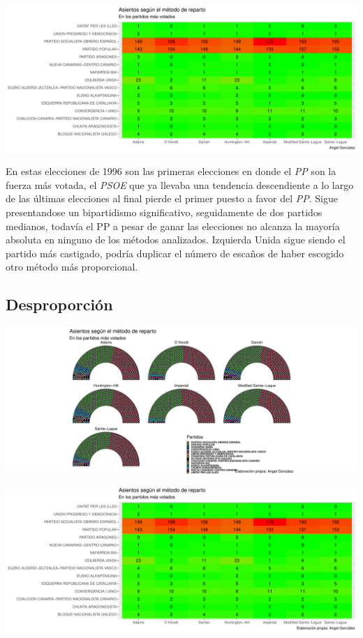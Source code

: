 \documentclass[12pt,a4paper,]{book}
\numberwithin{dummy}{section}
\theoremstyle{ocrenumbox}
\theoremstyle{blacknumex}
\theoremstyle{blacknumbox}
\theoremstyle{ocrenum}
\theoremstyle{ocrenum}
\begin{document}
\begin{center}\includegraphics[width=1\linewidth]{figurasR/unnamed-chunk-91-2} \end{center}

En estas elecciones de 1996 son las primeras elecciones en donde el
\emph{PP} son la fuerza más votada, el \emph{PSOE} que ya llevaba una
tendencia descendiente a lo largo de las últimas elecciones al final
pierde el primer puesto a favor del \emph{PP}. Sigue presentandose un
bipartidismo significativo, seguidamente de dos partidos medianos,
todavía el PP a pesar de ganar las elecciones no alcanza la mayoría
absoluta en ninguno de los métodos analizados. Izquierda Unida sigue
siendo el partido más castigado, podría duplicar el número de escaños de
haber escogido otro método más proporcional.

\hypertarget{desproporciuxf3n-6}{%
\subsection{Desproporción}\label{desproporciuxf3n-6}}

\begin{center}\includegraphics[width=1\linewidth]{figurasR/unnamed-chunk-92-1} \end{center}

\begin{center}\includegraphics[width=1\linewidth]{figurasR/unnamed-chunk-92-2} \end{center}
\end{document}
